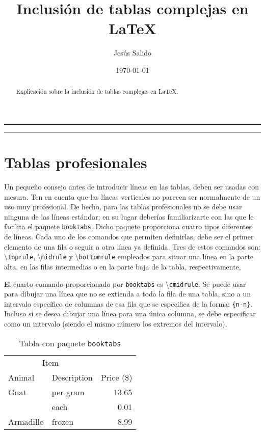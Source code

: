 \documentclass[11pt,a4paper]{article}
\author{Jesús Salido}
\title{Inclusión de tablas complejas en \LaTeX{}}
\date{\today}
\begin{document}
\maketitle
\begin{abstract}
	Explicación sobre la inclusión de tablas complejas en \LaTeX{}.
\end{abstract}

\hrule
\tableofcontents
\listoftables
\bigskip
\hrule



\newpage
\section{Tablas profesionales}
Un pequeño consejo antes de introducir líneas en las tablas, deben ser usadas con mesura. Ten en cuenta que las líneas verticales no parecen ser  normalmente de un uso muy profesional. De hecho, para las tablas profesionales no se debe usar ninguna de las líneas estándar; en su lugar deberías familiarizarte con las que le facilita el paquete \texttt{booktabs}. Dicho paquete proporciona cuatro tipos diferentes de líneas. Cada uno de los comandos que permiten definirlas, debe ser el primer elemento de una fila o seguir a otra línea ya definida. Tres de estos comandos son: \textbackslash \texttt{toprule}, \textbackslash \texttt{midrule} y \textbackslash \texttt{bottomrule} empleados para situar una línea en la parte alta, en las filas intermedias o en la parte baja de la tabla, respectivamente, 

El cuarto comando proporcionado por \texttt{booktabs} es \textbackslash \texttt{cmidrule}. Se puede usar para dibujar una línea que no se extienda a toda la fila de una tabla, sino a un intervalo específico de columnas de esa fila que se especifica de la forma: \texttt{\{n-n\}}. Incluso si se desea dibujar una línea para una única columna, se debe especificar como un intervalo (siendo el mismo número los extremos del intervalo).

\begin{table}[H]
   \centering
   	  \caption{Tabla con paquete \texttt{booktabs}}
   	  \label{tab:booktabs}      
   	  \begin{tabular}{llr}
      \toprule
      \multicolumn{2}{c}{Item} \\
      \cmidrule(r){1-2}
      Animal & Description & Price (\$) \\
      \midrule
      Gnat  & per gram & 13.65 \\
            & each     &  0.01 \\
      Armadillo & frozen & 8.99 \\
      \bottomrule
      \end{tabular}
\end{table}
\end{document}
